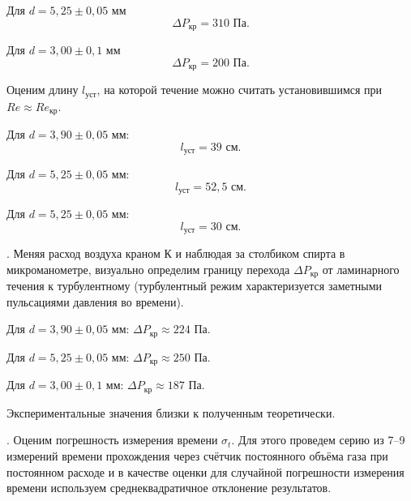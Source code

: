 \documentclass[a4paper,12pt]{article} %
\begin{document}
\medskip

\noindent Для $d = 5,25 \pm 0,05 \text{ мм}$ $$\Delta P_\text{кр} = 310 \text{ Па.}$$

\medskip	
	
\noindent Для $d = 3,00 \pm 0,1 \text{ мм}$ $$\Delta P_\text{кр} = 200 \text{ Па.}$$

\medskip		
	
  Оценим длину $ l_\text{уст} $, на которой течение можно считать установившимся при $ Re \approx Re_\text{кр} $.

\medskip 
	
\noindent Для $d = 3,90 \pm 0,05 \text{ мм}$: $$l_\text{уст} = 39 \text{ см.}$$

\medskip

\noindent Для $d = 5,25 \pm 0,05 \text{ мм}$: $$l_\text{уст} = 52,5 \text{ см.}$$

\medskip	

\noindent Для $d = 5,25 \pm 0,05 \text{ мм}$: $$l_\text{уст} = 30 \text{ см.}$$

\medskip	


. Меняя расход воздуха краном К и наблюдая за столбиком спирта в микроманометре, визуально определим границу перехода $ \Delta P_\text{кр} $ от ламинарного течения к турбулентному (турбулентный режим характеризуется заметными пульсациями давления во времени).

\medskip

\noindent Для $d = 3,90 \pm 0,05 \text{ мм}$: $\Delta P_\text{кр} \approx 224 \text{ Па.}$

\medskip

\noindent Для $d = 5,25 \pm 0,05 \text{ мм}$: $\Delta P_\text{кр} \approx 250 \text{ Па.}$

\medskip

\noindent Для $d = 3,00 \pm 0,1 \text{ мм}$: $\Delta P_\text{кр} \approx 187 \text{ Па.}$

\medskip

\noindent Экспериментальные значения близки к полученным теоретически.

\medskip

. Оценим погрешность измерения времени $\sigma_t$. Для этого проведем серию из 7–9 измерений времени прохождения через счётчик постоянного объёма газа при постоянном расходе и в качестве оценки для случайной погрешности измерения времени используем среднеквадратичное отклонение результатов.

\medskip
\medskip
\end{document}
